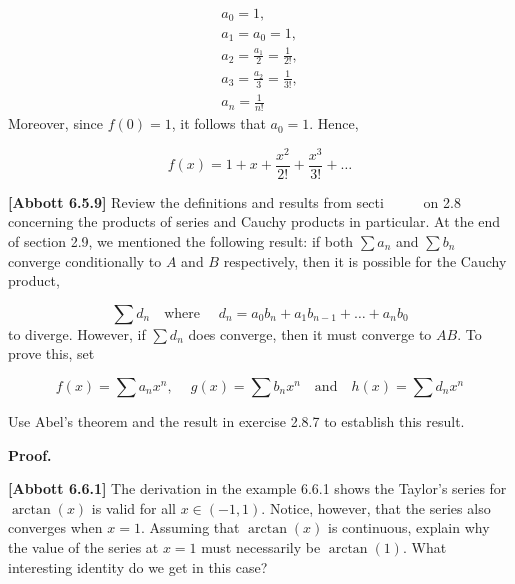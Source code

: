 \documentclass[10pt]{article}
\begin{document}
\begin{gather*}
a_{0} =1,\ \\
a_{1} =a_{0} =1,\\
a_{2} =\frac{a_{1}}{2} =\frac{1}{2!} ,\\
a_{3} =\frac{a_{2}}{3} =\frac{1}{3!} ,\\
a_{n} =\frac{1}{n!}
\end{gather*}
Moreover, since $\displaystyle f( 0) =1$, it follows that $\displaystyle a_{0} =1$. Hence,


\begin{equation*}
f( x) =1+x+\frac{x^{2}}{2!} +\frac{x^{3}}{3!} +\dotsc 
\end{equation*}


\textbf{[Abbott 6.5.9] }Review the definitions and results from secti \ \ \ \ \ on 2.8 concerning the products of series and Cauchy products in particular. At the end of section 2.9, we mentioned the following result: if both $\displaystyle \sum a_{n}$ and $\displaystyle \sum b_{n}$ converge conditionally to $\displaystyle A$ and $\displaystyle B$ respectively, then it is possible for the Cauchy product,


\begin{equation*}
\sum d_{n} \quad \text{where } \quad d_{n} =a_{0} b_{n} +a_{1} b_{n-1} +\dotsc +a_{n} b_{0}
\end{equation*}
to diverge. However, if $\displaystyle \sum d_{n}$ does converge, then it must converge to $\displaystyle AB$. To prove this, set


\begin{equation*}
f( x) =\sum a_{n} x^{n} ,\ \quad g( x) =\sum b_{n} x^{n} \quad \text{and} \quad h( x) =\sum d_{n} x^{n}
\end{equation*}


Use Abel's theorem and the result in exercise 2.8.7 to establish this result.



\textbf{Proof.}



\textbf{[Abbott 6.6.1]} The derivation in the example 6.6.1 shows the Taylor's series for $\displaystyle \arctan( x)$ is valid for all $\displaystyle x\in ( -1,1)$. Notice, however, that the series also converges when $\displaystyle x=1$. Assuming that $\displaystyle \arctan( x)$ is continuous, explain why the value of the series at $\displaystyle x=1$ must necessarily be $\displaystyle \arctan( 1)$. What interesting identity do we get in this case?
\end{document}
